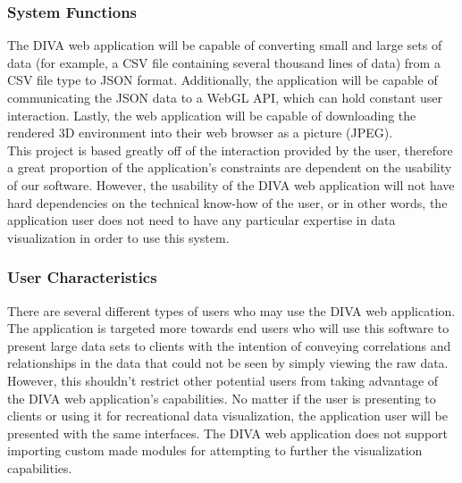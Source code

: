 \documentclass[journal,10pt,onecolumn,compsoc]{IEEEtran} \usepackage[margin=1.0in]{geometry} \usepackage{pdfpages}
\begin{document}
        \subsubsection{System Functions}
        The DIVA web application will be capable of converting small and large sets of data (for example, a CSV file containing several thousand lines of data) from a CSV file type to JSON format. Additionally, the application will be capable of communicating the JSON data to a WebGL API, which can hold constant user interaction. Lastly, the web application will be capable of downloading the rendered 3D environment into their web browser as a picture (JPEG). \\
        \newline This project is based greatly off of the interaction provided by the user, therefore a great proportion of the application's constraints are dependent on the usability of our software. However, the usability of the DIVA web application will not have hard dependencies on the technical know-how of the user, or in other words, the application user does not need to have any particular expertise in data visualization in order to use this system. 
        \subsubsection{User Characteristics}
        There are several different types of users who may use the DIVA web application. The application is targeted more towards end users who will use this software to present large data sets to clients with the intention of conveying correlations and relationships in the data that could not be seen by simply viewing the raw data. However, this shouldn't restrict other potential users from taking advantage of the DIVA web application's capabilities. No matter if the user is presenting to clients or using it for recreational data visualization, the application user will be presented with the same interfaces. The DIVA web application does not support importing custom made modules for attempting to further the visualization capabilities. 
\end{document}
